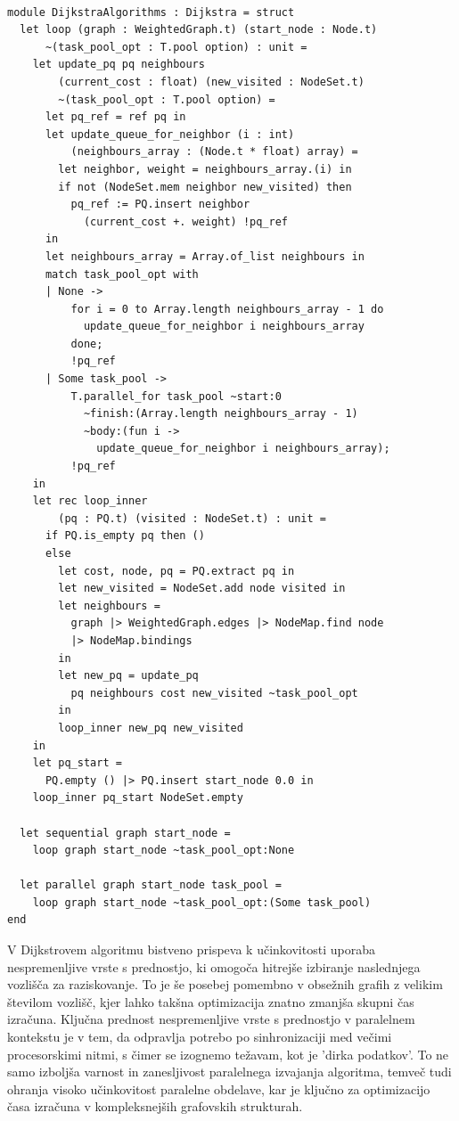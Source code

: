 \documentclass[mat1, tisk]{fmfdelo}
\begin{document}
\begin{lstlisting}[label=lst:dijkstra]

module DijkstraAlgorithms : Dijkstra = struct
  let loop (graph : WeightedGraph.t) (start_node : Node.t)
      ~(task_pool_opt : T.pool option) : unit =
    let update_pq pq neighbours
        (current_cost : float) (new_visited : NodeSet.t)
        ~(task_pool_opt : T.pool option) =
      let pq_ref = ref pq in
      let update_queue_for_neighbor (i : int)
          (neighbours_array : (Node.t * float) array) =
        let neighbor, weight = neighbours_array.(i) in
        if not (NodeSet.mem neighbor new_visited) then
          pq_ref := PQ.insert neighbor 
            (current_cost +. weight) !pq_ref
      in
      let neighbours_array = Array.of_list neighbours in
      match task_pool_opt with
      | None ->
          for i = 0 to Array.length neighbours_array - 1 do
            update_queue_for_neighbor i neighbours_array
          done;
          !pq_ref
      | Some task_pool ->
          T.parallel_for task_pool ~start:0
            ~finish:(Array.length neighbours_array - 1)
            ~body:(fun i -> 
              update_queue_for_neighbor i neighbours_array);
          !pq_ref
    in
    let rec loop_inner 
        (pq : PQ.t) (visited : NodeSet.t) : unit =
      if PQ.is_empty pq then ()
      else
        let cost, node, pq = PQ.extract pq in
        let new_visited = NodeSet.add node visited in
        let neighbours =
          graph |> WeightedGraph.edges |> NodeMap.find node
          |> NodeMap.bindings
        in
        let new_pq = update_pq 
          pq neighbours cost new_visited ~task_pool_opt
        in
        loop_inner new_pq new_visited
    in
    let pq_start = 
      PQ.empty () |> PQ.insert start_node 0.0 in
    loop_inner pq_start NodeSet.empty

  let sequential graph start_node =
    loop graph start_node ~task_pool_opt:None

  let parallel graph start_node task_pool =
    loop graph start_node ~task_pool_opt:(Some task_pool)
end
\end{lstlisting}

V Dijkstrovem algoritmu bistveno prispeva k učinkovitosti uporaba nespremenljive vrste s prednostjo, ki omogoča
hitrejše izbiranje naslednjega vozlišča za raziskovanje. To je še posebej pomembno v obsežnih grafih z velikim številom
vozlišč, kjer lahko takšna optimizacija znatno zmanjša skupni čas izračuna. Ključna prednost nespremenljive vrste s
prednostjo v paralelnem kontekstu je v tem, da odpravlja potrebo po sinhronizaciji med večimi procesorskimi nitmi,
s čimer se izognemo težavam, kot je 'dirka podatkov'. To ne samo izboljša varnost in zanesljivost paralelnega izvajanja
algoritma, temveč tudi ohranja visoko učinkovitost paralelne obdelave, kar je ključno za optimizacijo časa izračuna v
kompleksnejših grafovskih strukturah.
\end{document}
